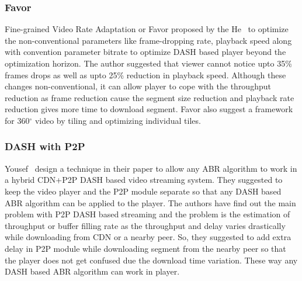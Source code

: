 \subsubsection{Favor}
Fine-grained Video Rate Adaptation or Favor\cite{10.1145/3204949.3204957} proposed by the He \etal\ to optimize the non-conventional parameters like frame-dropping rate, playback speed along with convention parameter bitrate to optimize DASH based player beyond the optimization horizon. The author suggested that viewer cannot notice upto 35\% frames drops as well as upto 25\% reduction in playback speed. Although these changes non-conventional, it can allow player to cope with the throughput reduction as frame reduction cause the segment size reduction and playback rate reduction gives more time to download segment. Favor also suggest a framework for 360$^{\circ}$ video by tiling and optimizing individual tiles.


\subsubsection{DASH with P2P}
Yousef \etal\ design a technique in their paper \cite{10.1145/3339825.3391859} to allow any ABR algorithm to work in a hybrid CDN+P2P DASH based video streaming system. They suggested to keep the video player and the P2P module separate so that any DASH based ABR algorithm can be applied to the player. The authors have find out the main problem with P2P DASH based streaming and the problem is the estimation of throughput or buffer filling rate as the throughput and delay varies drastically while downloading from CDN or a nearby peer. So, they suggested to add extra delay in P2P module while downloading segment from the nearby peer so that the player does not get confused due the download time variation. These way any DASH based ABR algorithm can work in player.

